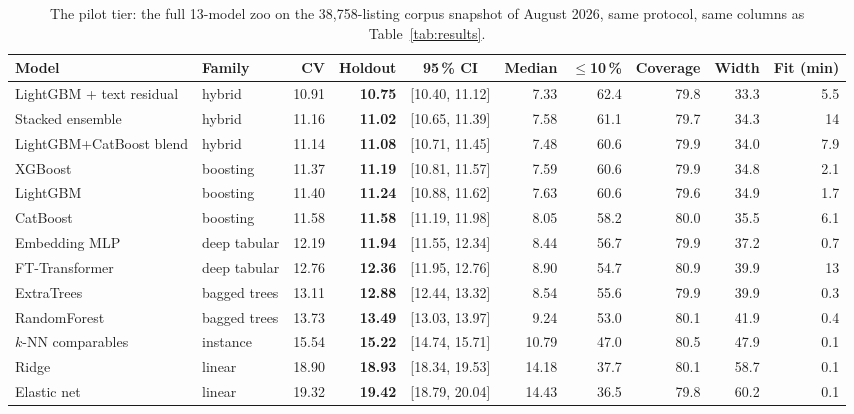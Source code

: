 \begin{table}[t]
\centering
\caption{The pilot tier: the full 13-model zoo on the 38{,}758-listing corpus snapshot of August 2026, same protocol, same columns as Table~\ref{tab:results}.}
\label{tab:pilot}
\footnotesize\setlength{\tabcolsep}{5pt}
\begin{tabular}{llrrcrrrrr}
\toprule
Model & Family & CV & Holdout & 95\,\% CI & Median & $\le$10\,\% & Coverage & Width & Fit (min) \\
\midrule
LightGBM + text residual & hybrid & 10.91 & \textbf{10.75} & [10.40, 11.12] & 7.33 & 62.4 & 79.8 & 33.3 & 5.5 \\
Stacked ensemble & hybrid & 11.16 & \textbf{11.02} & [10.65, 11.39] & 7.58 & 61.1 & 79.7 & 34.3 & 14 \\
LightGBM+CatBoost blend & hybrid & 11.14 & \textbf{11.08} & [10.71, 11.45] & 7.48 & 60.6 & 79.9 & 34.0 & 7.9 \\
XGBoost & boosting & 11.37 & \textbf{11.19} & [10.81, 11.57] & 7.59 & 60.6 & 79.9 & 34.8 & 2.1 \\
LightGBM & boosting & 11.40 & \textbf{11.24} & [10.88, 11.62] & 7.63 & 60.6 & 79.6 & 34.9 & 1.7 \\
CatBoost & boosting & 11.58 & \textbf{11.58} & [11.19, 11.98] & 8.05 & 58.2 & 80.0 & 35.5 & 6.1 \\
Embedding MLP & deep tabular & 12.19 & \textbf{11.94} & [11.55, 12.34] & 8.44 & 56.7 & 79.9 & 37.2 & 0.7 \\
FT-Transformer & deep tabular & 12.76 & \textbf{12.36} & [11.95, 12.76] & 8.90 & 54.7 & 80.9 & 39.9 & 13 \\
ExtraTrees & bagged trees & 13.11 & \textbf{12.88} & [12.44, 13.32] & 8.54 & 55.6 & 79.9 & 39.9 & 0.3 \\
RandomForest & bagged trees & 13.73 & \textbf{13.49} & [13.03, 13.97] & 9.24 & 53.0 & 80.1 & 41.9 & 0.4 \\
$k$-NN comparables & instance & 15.54 & \textbf{15.22} & [14.74, 15.71] & 10.79 & 47.0 & 80.5 & 47.9 & 0.1 \\
Ridge & linear & 18.90 & \textbf{18.93} & [18.34, 19.53] & 14.18 & 37.7 & 80.1 & 58.7 & 0.1 \\
Elastic net & linear & 19.32 & \textbf{19.42} & [18.79, 20.04] & 14.43 & 36.5 & 79.8 & 60.2 & 0.1 \\
\bottomrule
\end{tabular}
\end{table}
